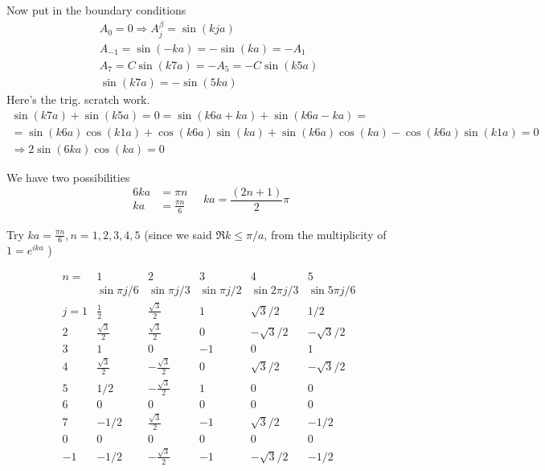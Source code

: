 \documentclass[twoside,10pt]{amsart}
\begin{document}
Now put in the boundary conditions
\[
\begin{gathered}
  A_0 = 0 \Longrightarrow A_j^{\beta} = \sin{ (kja)}  \\
  A_{-1} = \sin{(-ka)} = -\sin{(ka)} = -A_1 \\
  A_7 = C \sin{(k7a)} = -A_5 = -C \sin{ (k5a) } \\
  \sin{ (k7a) } = -\sin{ (5ka) }  
\end{gathered}
\]
Here's the trig. scratch work.
\footnotesize
\[
\begin{gathered}
  \sin{(k7a)} + \sin{(k5a)} = 0 = \sin{(k6a+ka)} + \sin{(k6a-ka)} =  \\
  = \sin{(k6a)}\cos{(k1a)} + \cos{(k6a)}\sin{(ka)} + \sin{(k6a)}\cos{(ka)} - \cos{(k6a)}\sin{(k1a)} = 0 \\
\Longrightarrow 2\sin{(6ka)}\cos{(ka)} = 0 
\end{gathered}
\]

\normalsize

We have two possibilities
\[
\begin{aligned} 
  6ka & = \pi n \\
  ka & = \frac{ \pi n}{6} 
\end{aligned}
 \quad
ka = \frac{(2n+1)}{2} \pi 
\]

Try $ ka  = \frac{ \pi n}{6}, n=1,2,3,4,5 $ (since we said $\Re k \leq \pi/a $, from the multiplicity of $1 = e^{ika}$ ) 

\[
\begin{matrix}
  n =  &  1               & 2                & 3                 &  4                  &   5    \\   
       &  \sin{ \pi j /6} &  \sin{ \pi j /3} &  \sin{ \pi j /2}  &  \sin{ 2 \pi j /3}  &  \sin{ 5 \pi j /6}   \\
  j= 1 & \frac{1}{2}      &  \frac{\sqrt{3}}{2}     &  1                & \sqrt{3}/2          & 1/2  \\   
 2  & \frac{\sqrt{3}}{2}      &  \frac{\sqrt{3}}{2}     &  0                & -\sqrt{3}/2          & -\sqrt{3}/2  \\   
 3 & 1      &  0     &  -1                & 0          & 1  \\
 4  & \frac{\sqrt{3}}{2}      &  -\frac{\sqrt{3}}{2}     &  0                & \sqrt{3}/2          & -\sqrt{3}/2  \\   
 5  & 1/2      &  -\frac{\sqrt{3}}{2}     &  1                & 0         & 0  \\   
 6 & 0 & 0 & 0 & 0 & 0 \\
 7  & -1/2      &  \frac{\sqrt{3}}{2}     &  -1                & \sqrt{3}/2          & -1/2  \\   
0 & 0 & 0 & 0 & 0 & 0 \\
  -1  & -1/2      &  -\frac{\sqrt{3}}{2}     &  -1                & -\sqrt{3}/2          & -1/2  \\   
\end{matrix}
\]
\end{document}
